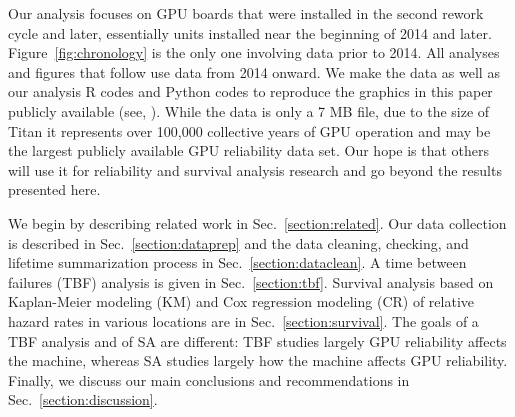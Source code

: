 Our analysis focuses on GPU boards that were installed in the second
rework cycle and later, essentially units installed near the beginning
of 2014 and later. Figure~\ref{fig:chronology} is the only one
involving data prior to 2014. All analyses and figures that follow use
data from 2014 onward. We make the data as well as our analysis R
codes and Python codes to reproduce the graphics in this paper
publicly available (see, \cite[repository to be added in final
version]{repositoryreference,rcodes,pycodes}).  While the data is only
a 7 MB file, due to the size of Titan it represents over 100,000
collective years of GPU operation and may be the largest publicly
available GPU reliability data set. Our hope is that others will use
it for reliability and survival analysis research and go beyond the
results presented here.

We begin by describing related work in Sec.~\ref{section:related}. Our
data collection is described in Sec.~\ref{section:dataprep} and the
data cleaning, checking, and lifetime summarization process in
Sec.~\ref{section:dataclean}. A time between failures (TBF) analysis
is given in Sec.~\ref{section:tbf}. Survival analysis  based on
Kaplan-Meier modeling (KM) and Cox regression modeling (CR) of
relative hazard rates in various locations are in
Sec.~\ref{section:survival}. The goals of a TBF analysis and of
SA are different: TBF studies largely  GPU
reliability affects the machine, whereas SA studies largely how the
machine affects GPU reliability.  Finally, we discuss our main
conclusions and recommendations in Sec.~\ref{section:discussion}.
 


